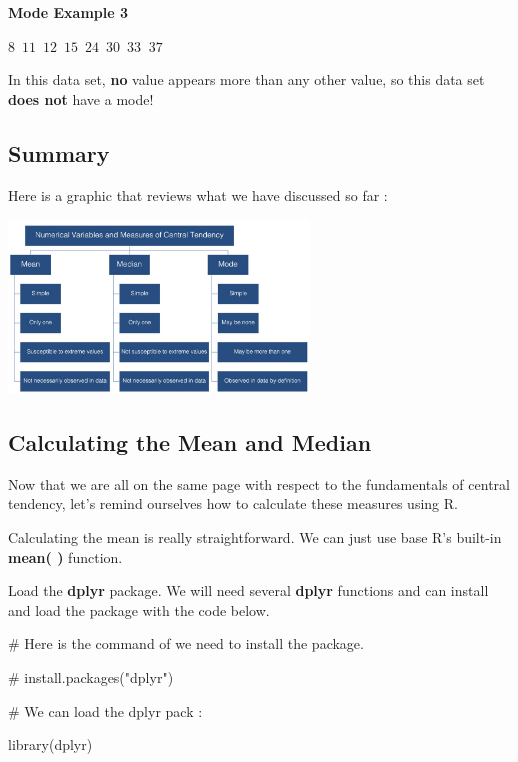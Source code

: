 \documentclass[
  letterpaper,
  DIV=11,
  numbers=noendperiod]{scrreprt}
\newenvironment{Shaded}{\begin{snugshade}}{\end{snugshade}}
\newcommand{\CommentTok}[1]{\textcolor[rgb]{0.37,0.37,0.37}{#1}}
\newcommand{\FunctionTok}[1]{\textcolor[rgb]{0.28,0.35,0.67}{#1}}
\newcommand{\NormalTok}[1]{\textcolor[rgb]{0.00,0.23,0.31}{#1}}
\begin{document}
\textbf{Mode Example 3}

\(8\,\,\, 11\,\,\,  12\,\,\,  15\,\,\,  24\,\,\,  30\,\,\,  33\,\,\ 37\)

In this data set, \textbf{no} value appears more than any other value,
so this data set \textbf{does not} have a mode!

\subsection*{Summary}\label{summary-1}

Here is a graphic that reviews what we have discussed so far :

\includegraphics[width=0.6\textwidth,height=\textheight]{./images/Daily-4-Pic-10.jpg}

\subsection*{Calculating the Mean and
Median}\label{calculating-the-mean-and-median}

Now that we are all on the same page with respect to the fundamentals of
central tendency, let's remind ourselves how to calculate these measures
using R.

Calculating the mean is really straightforward. We can just use base R's
built-in \textbf{mean( )} function.

Load the \textbf{dplyr} package. We will need several \textbf{dplyr}
functions and can install and load the package with the code below.

\begin{Shaded}
\begin{Highlighting}[]
\CommentTok{\# Here is the command of we need to install the package. }

\CommentTok{\# install.packages("dplyr")}

\CommentTok{\# We can load the dplyr pack :}

\FunctionTok{library}\NormalTok{(dplyr)}
\end{Highlighting}
\end{Shaded}
\end{document}

